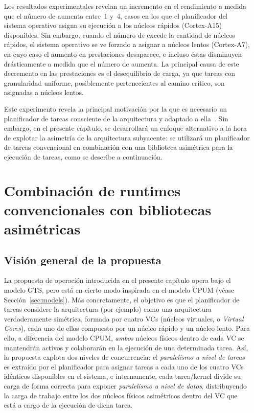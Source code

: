 Los resultados experimentales revelan un incremento en el rendimiento a medida que el número de \wts aumenta entre~1 y~4,
casos en los que el planificador del sistema operativo asigna su ejecución a los núcleos rápidos (Cortex-A15) disponibles.
Sin embargo, cuando el número de \wts excede la cantidad de núcleos rápidos, el sistema operativo se ve forzado a asignar
\wts a núcleos lentos (Cortex-A7), en cuyo caso el aumento en prestaciones desaparece, e incluso éstas disminuyen drásticamente 
a medida que el número de \wts aumenta. La principal causa de este decremento en las prestaciones es el desequilibrio de carga,
ya que tareas con granularidad uniforme, posiblemente pertenecientes al camino crítico, son asignadas a núcleos lentos.

Este experimento revela la principal motivación por la que es necesario un planificador de tareas consciente de la
arquitectura y adaptado a ella~\cite{botlev}. Sin embargo, en el presente capítulo, se desarrollará un enfoque alternativo
a la hora de explotar la asimetría de la arquitectura subyacente: se utilizará un planificador de tareas convencional en combinación
con una biblioteca asimétrica para la ejecución de tareas, como se describe a continuación.

\section{Combinación de runtimes convencionales con bibliotecas asimétricas}

\subsection{Visión general de la propuesta}

La propuesta de operación introducida en el presente capítulo opera bajo el modelo GTS, pero está en cierto modo 
inspirada en el modelo CPUM (véase Sección~\ref{sec:models}). Más concretamente, el objetivo es que el planificador
de tareas considere la arquitectura \odroid (por ejemplo) como una arquitectura verdaderamente simétrica, formada por 
cuatro VCs (núcleos virtuales, o {\em Virtual Cores}), cada uno de ellos compuesto por un núcleo rápido y un núcleo
lento. Para ello, a diferencia del modelo CPUM, {\em ambos} núcleos físicos dentro de cada VC se mantendrán activos y 
colaborarán en la ejecución de una determinada tarea. Así, la propuesta explota dos niveles de concurrencia: el {\em paralelismo
a nivel de tareas} es extraído por el planificador para asignar tareas a cada uno de los cuatro VCs idénticos disponibles en
el sistema, e internamente, cada tarea/kernel divide su carga de forma correcta para exponer {\em paralelismo a nivel de datos}, 
distribuyendo la carga de trabajo entre los dos núcleos físicos asimétricos dentro del VC que está a cargo de la ejecución
de dicha tarea.

